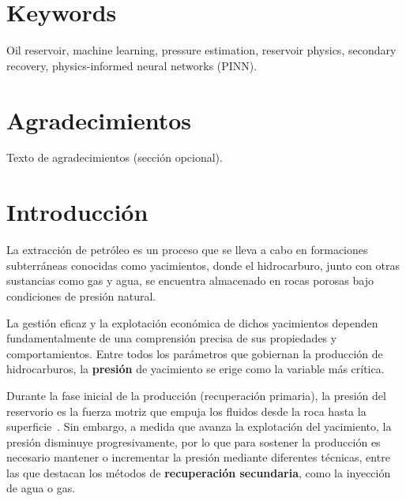 \documentclass[12pt,a4paper]{article}
\begin{document}
\newpage
\section{Keywords}

Oil reservoir, machine learning, pressure estimation, reservoir physics, secondary recovery, physics-informed neural networks (PINN).

\newpage
\section{Agradecimientos}

Texto de agradecimientos (sección opcional).


\newpage
\section{Introducción}

La extracción de petróleo es un proceso que se lleva a cabo en formaciones subterráneas conocidas como
yacimientos, donde el hidrocarburo, junto con otras sustancias como gas y agua, se encuentra almacenado en
rocas porosas bajo condiciones de presión natural.

La gestión eficaz y la explotación económica de dichos yacimientos dependen fundamentalmente de una
comprensión precisa de sus propiedades y comportamientos. Entre todos los parámetros que gobiernan la
producción de hidrocarburos, la \textbf{presión} de yacimiento se erige como la variable más crítica.

Durante la fase inicial de la producción (recuperación primaria), la presión del reservorio es la fuerza
motriz que empuja los fluidos desde la roca hasta la superficie~\cite{ref1}. Sin embargo, a medida que
avanza la explotación del yacimiento, la presión disminuye progresivamente, por lo que para sostener la
producción es necesario mantener o incrementar la presión mediante diferentes técnicas, entre las que
destacan los métodos de \textbf{recuperación secundaria}, como la inyección de agua o gas.
\end{document}
